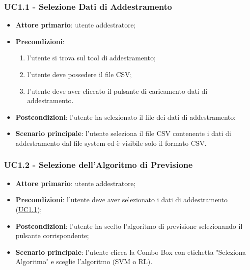 		\subsubsection{UC1.1 - Selezione Dati di Addestramento }
		\begin{itemize}
			\item\textbf{Attore primario}: utente addestratore;
			\item\textbf{Precondizioni}:
				\begin{enumerate}
					\item l’utente si trova sul tool di addestramento;
					\item l’utente deve possedere il file CSV;
					\item l’utente deve aver cliccato il pulsante di caricamento dati di addestramento.
				\end{enumerate}
			\item\textbf{Postcondizioni}: l’utente ha selezionato il file dei dati di addestramento;
			\item\textbf{Scenario principale}: l’utente seleziona il file CSV contenente i dati di addestramento dal file system ed è visibile solo il formato CSV.
		\end{itemize}
		
		\label{par:UC1.2}
		\subsubsection{UC1.2 - Selezione dell’Algoritmo di Previsione}
		\begin{itemize}
			\item\textbf{Attore primario}: utente addestratore;
			\item\textbf{Precondizioni}: l’utente deve aver selezionato i dati di addestramento (\hyperref[par:UC1.1]{UC1.1});
			\item\textbf{Postcondizioni}: l’utente ha scelto l’algoritmo di previsione selezionando il pulsante corrispondente;
			\item\textbf{Scenario principale}: l’utente clicca la Combo Box con etichetta "Seleziona Algoritmo" e sceglie l’algoritmo (SVM o RL).
		\end{itemize}
	
	\label{par:UC1.3}
